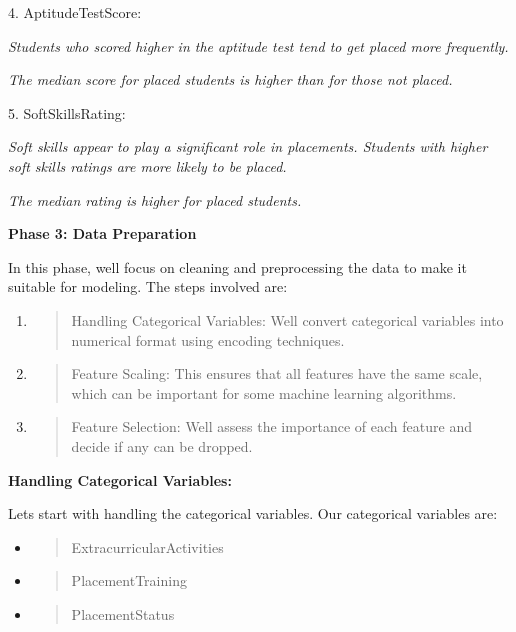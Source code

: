\documentclass[]{article}
\begin{document}
4. AptitudeTestScore:

\emph{Students who scored higher in the aptitude test tend to get placed
more frequently.}

\emph{The median score for placed students is higher than for those not
placed.}

5. SoftSkillsRating:

\emph{Soft skills appear to play a significant role in placements.
Students with higher soft skills ratings are more likely to be placed.}

\emph{The median rating is higher for placed students.}

\textbf{Phase 3: Data Preparation}

In this phase, we\textquotesingle ll focus on cleaning and preprocessing
the data to make it suitable for modeling. The steps involved are:

\begin{enumerate}
\def\labelenumi{\arabic{enumi}.}
\item
  \begin{quote}
  Handling Categorical Variables: We\textquotesingle ll convert
  categorical variables into numerical format using encoding techniques.
  \end{quote}
\item
  \begin{quote}
  Feature Scaling: This ensures that all features have the same scale,
  which can be important for some machine learning algorithms.
  \end{quote}
\item
  \begin{quote}
  Feature Selection: We\textquotesingle ll assess the importance of each
  feature and decide if any can be dropped.
  \end{quote}
\end{enumerate}

\textbf{Handling Categorical Variables:}

Let\textquotesingle s start with handling the categorical variables. Our
categorical variables are:

\begin{itemize}
\item
  \begin{quote}
  ExtracurricularActivities
  \end{quote}
\item
  \begin{quote}
  PlacementTraining
  \end{quote}
\item
  \begin{quote}
  PlacementStatus
  \end{quote}
\end{itemize}
\end{document}
